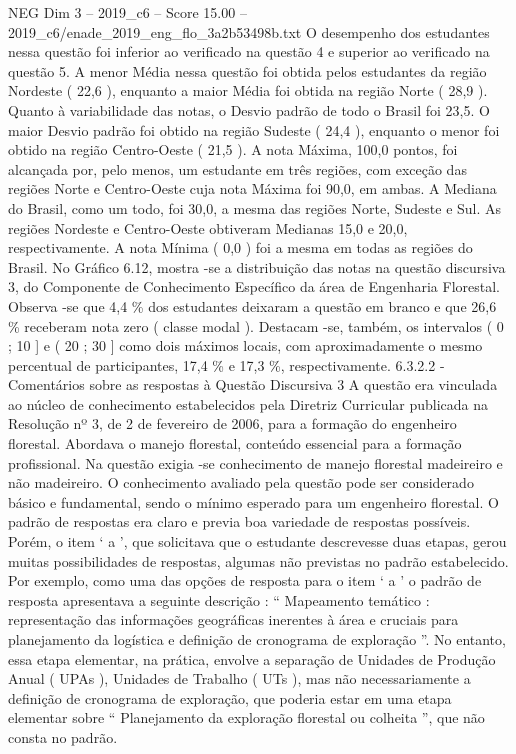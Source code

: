 \begin{textsample}{NEG Dim 3 – 2019\_c6 – Score 15.00 – 2019\_c6/enade\_2019\_eng\_flo\_3a2b53498b.txt}
O desempenho dos estudantes nessa questão foi inferior ao verificado na questão 4 e superior ao verificado na questão 5.
A menor Média nessa questão foi obtida pelos estudantes da região Nordeste ( 22,6 ), enquanto a maior Média foi obtida na região Norte ( 28,9 ).
Quanto à variabilidade das notas, o Desvio padrão de todo o Brasil foi 23,5.
O maior Desvio padrão foi obtido na região Sudeste ( 24,4 ), enquanto o menor foi obtido na região Centro-Oeste ( 21,5 ).
A nota Máxima, 100,0 pontos, foi alcançada por, pelo menos, um estudante em três regiões, com exceção das regiões Norte e Centro-Oeste cuja nota Máxima foi 90,0, em ambas.
A Mediana do Brasil, como um todo, foi 30,0, a mesma das regiões Norte, Sudeste e Sul.
As regiões Nordeste e Centro-Oeste obtiveram Medianas 15,0 e 20,0, respectivamente.
A nota Mínima ( 0,0 ) foi a mesma em todas as regiões do Brasil.
No Gráfico 6.12, mostra -se a distribuição das notas na questão discursiva 3, do Componente de Conhecimento Específico da área de Engenharia Florestal.
Observa -se que 4,4 \% dos estudantes deixaram a questão em branco e que 26,6 \% receberam nota zero ( classe modal ).
Destacam -se, também, os intervalos ( 0 ; 10 ] e ( 20 ; 30 ] como dois máximos locais, com aproximadamente o mesmo percentual de participantes, 17,4 \% e 17,3 \%, respectivamente. 6.3.2.2 - Comentários sobre as respostas à Questão Discursiva 3 A questão era vinculada ao núcleo de conhecimento estabelecidos pela Diretriz Curricular publicada na Resolução nº 3, de 2 de fevereiro de 2006, para a formação do engenheiro florestal.
Abordava o manejo florestal, conteúdo essencial para a formação profissional.
Na questão exigia -se conhecimento de manejo florestal madeireiro e não madeireiro.
O conhecimento avaliado pela questão pode ser considerado básico e fundamental, sendo o mínimo esperado para um engenheiro florestal.
O padrão de respostas era claro e previa boa variedade de respostas possíveis.
Porém, o item ‘ a ’, que solicitava que o estudante descrevesse duas etapas, gerou muitas possibilidades de respostas, algumas não previstas no padrão estabelecido.
Por exemplo, como uma das opções de resposta para o item ‘ a ’ o padrão de resposta apresentava a seguinte descrição : “ Mapeamento temático : representação das informações geográficas inerentes à área e cruciais para planejamento da logística e definição de cronograma de exploração ”.
No entanto, essa etapa elementar, na prática, envolve a separação de Unidades de Produção Anual ( UPAs ), Unidades de Trabalho ( UTs ), mas não necessariamente a definição de cronograma de exploração, que poderia estar em uma etapa elementar sobre “ Planejamento da exploração florestal ou colheita ”, que não consta no padrão.

\end{textsample}
